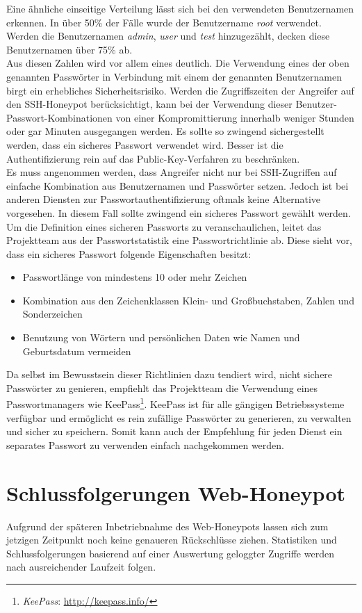 Eine ähnliche einseitige Verteilung lässt sich bei den verwendeten Benutzernamen erkennen. In über 50\% der Fälle wurde der Benutzername \textit{root} verwendet. Werden die Benutzernamen \textit{admin}, \textit{user} und \textit{test} hinzugezählt, decken diese Benutzernamen über 75\% ab.\\

Aus diesen Zahlen wird vor allem eines deutlich. Die Verwendung eines der oben genannten Passwörter in Verbindung mit einem der genannten Benutzernamen birgt ein erhebliches Sicherheitsrisiko. Werden die Zugriffszeiten der Angreifer auf den SSH-Honeypot berücksichtigt, kann bei der Verwendung dieser Benutzer-Passwort-Kombinationen von einer Kompromittierung innerhalb weniger Stunden oder gar Minuten ausgegangen werden. Es sollte so zwingend sichergestellt werden, dass ein sicheres Passwort verwendet wird. Besser ist die Authentifizierung rein auf das Public-Key-Verfahren zu beschränken.\\

Es muss angenommen werden, dass Angreifer nicht nur bei SSH-Zugriffen auf einfache Kombination aus Benutzernamen und Passwörter setzen. Jedoch ist bei anderen Diensten zur Passwortauthentifizierung oftmals keine Alternative vorgesehen. In diesem Fall sollte zwingend ein sicheres Passwort gewählt werden. Um die Definition eines sicheren Passworts zu veranschaulichen, leitet das Projektteam aus der Passwortstatistik eine Passwortrichtlinie ab. Diese sieht vor, dass ein sicheres Passwort folgende Eigenschaften besitzt:

\begin{itemize}
\item Passwortlänge von mindestens 10 oder mehr Zeichen
\item Kombination aus den Zeichenklassen Klein- und Großbuchstaben, Zahlen und Sonderzeichen
\item Benutzung von Wörtern und persönlichen Daten wie Namen und Geburtsdatum vermeiden
\end{itemize}

Da selbst im Bewusstsein dieser Richtlinien dazu tendiert wird, nicht sichere Passwörter zu genieren, empfiehlt das Projektteam die Verwendung eines Passwortmanagers wie KeePass\footnote{ \textit{KeePass}: \url{http://keepass.info/}}. KeePass ist für alle gängigen Betriebssysteme verfügbar und ermöglicht es rein zufällige Passwörter zu generieren, zu verwalten und sicher zu speichern. Somit kann auch der Empfehlung für jeden Dienst ein separates Passwort zu verwenden einfach nachgekommen werden.

\section{Schlussfolgerungen Web-Honeypot}
\label{sec:Schlussfolgerungen Web-Honeypot}

Aufgrund der späteren Inbetriebnahme des Web-Honeypots lassen sich zum jetzigen Zeitpunkt noch keine genaueren Rückschlüsse ziehen. Statistiken und Schlussfolgerungen basierend auf einer Auswertung geloggter Zugriffe werden nach ausreichender Laufzeit folgen.